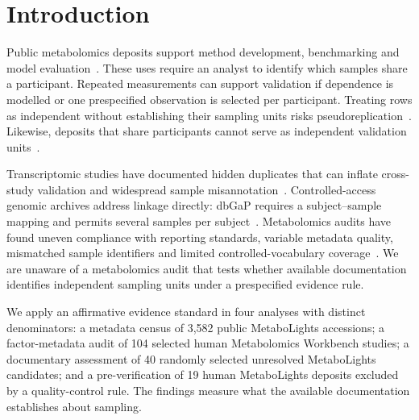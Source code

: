 \section{Introduction}\label{sec:intro}

Public metabolomics deposits support method development, benchmarking and model evaluation~\citep{haug2020metabolights,sud2016workbench}. These uses require an analyst to identify which samples share a participant. Repeated measurements can support validation if dependence is modelled or one prespecified observation is selected per participant. Treating rows as independent without establishing their sampling units risks pseudoreplication~\citep{hurlbert1984pseudoreplication,lazic2010pseudoreplication}. Likewise, deposits that share participants cannot serve as independent validation units~\citep{riley2016external}.

Transcriptomic studies have documented hidden duplicates that can inflate cross-study validation and widespread sample misannotation~\citep{waldron2016doppelganger,toker2016whose}. Controlled-access genomic archives address linkage directly: dbGaP requires a subject--sample mapping and permits several samples per subject~\citep{dbgap_submission}. Metabolomics audits have found uneven compliance with reporting standards, variable metadata quality, mismatched sample identifiers and limited controlled-vocabulary coverage~\citep{spicer2017compliance,spicer2017decade,ferreira2017assessing,powell2021mwtab,jarmusch2020redu}. We are unaware of a metabolomics audit that tests whether available documentation identifies independent sampling units under a prespecified evidence rule.

We apply an affirmative evidence standard in four analyses with distinct denominators: a metadata census of 3,582 public MetaboLights accessions; a factor-metadata audit of 104 selected human Metabolomics Workbench studies; a documentary assessment of 40 randomly selected unresolved MetaboLights candidates; and a pre-verification of 19 human MetaboLights deposits excluded by a quality-control rule. The findings measure what the available documentation establishes about sampling.
